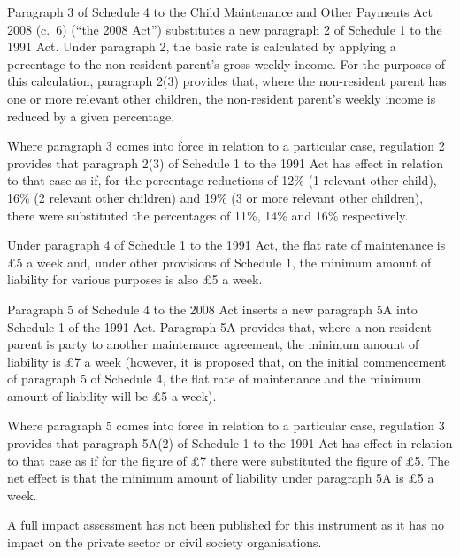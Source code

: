 \documentclass[12pt,a4paper]{article}
\begin{document}
Paragraph 3 of Schedule 4 to the Child Maintenance and Other Payments Act 2008 (c.~6) (“the 2008 Act”) substitutes a new paragraph 2 of Schedule 1 to the 1991 Act. Under paragraph 2, the basic rate is calculated by applying a percentage to the non-resident parent’s gross weekly income. For the purposes of this calculation, paragraph 2(3) provides that, where the non-resident parent has one or more relevant other children, the non-resident parent’s weekly income is reduced by a given percentage.

Where paragraph 3 comes into force in relation to a particular case, regulation 2 provides that paragraph 2(3) of Schedule 1 to the 1991 Act has effect in relation to that case as if, for the percentage reductions of 12\% (1 relevant other child), 16\% (2 relevant other children) and 19\% (3 or more relevant other children), there were substituted the percentages of 11\%, 14\% and 16\% respectively.

Under paragraph 4 of Schedule 1 to the 1991 Act, the flat rate of maintenance is £5 a week and, under other provisions of Schedule 1, the minimum amount of liability for various purposes is also £5 a week.

Paragraph 5 of Schedule 4 to the 2008 Act inserts a new paragraph 5A into Schedule 1 of the 1991 Act. Paragraph 5A provides that, where a non-resident parent is party to another maintenance agreement, the minimum amount of liability is £7 a week (however, it is proposed that, on the initial commencement of paragraph 5 of Schedule 4, the flat rate of maintenance and the minimum amount of liability will be £5 a week).

Where paragraph 5 comes into force in relation to a particular case, regulation 3 provides that paragraph 5A(2) of Schedule 1 to the 1991 Act has effect in relation to that case as if for the figure of £7 there were substituted the figure of £5. The net effect is that the minimum amount of liability under paragraph 5A is £5 a week.

A full impact assessment has not been published for this instrument as it has no impact on the private sector or civil society organisations. 
\end{document}

